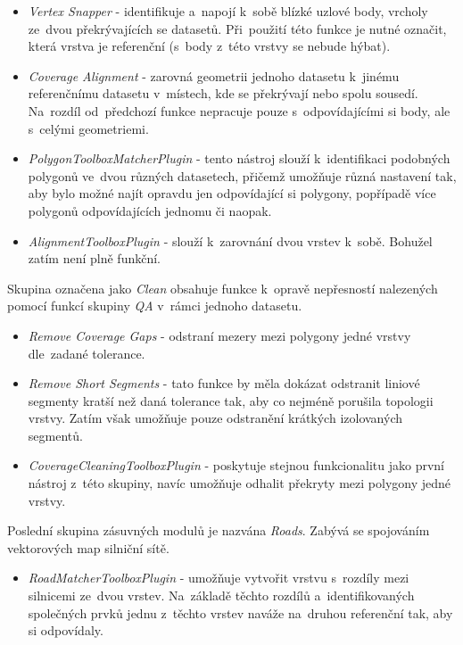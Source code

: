 \begin{itemize}
 \item \textit{Vertex Snapper} - identifikuje a~napojí k~sobě blízké uzlové
    body, vrcholy ze~dvou překrývajících se datasetů. Při~použití této funkce
    je nutné označit, která vrstva je referenční (s~body z~této vrstvy se 
    nebude hýbat).
 \item \textit{Coverage Alignment} - zarovná geometrii jednoho datasetu 
    k~jinému referenčnímu datasetu v~místech, kde se překrývají nebo spolu
    sousedí. Na~rozdíl od~předchozí funkce nepracuje pouze s~odpovídajícími
    si body, ale s~celými geometriemi.
 \item \textit{PolygonToolboxMatcherPlugin} - tento nástroj slouží k~identifikaci
    podobných polygonů ve~dvou různých datasetech, přičemž umožňuje různá 
    nastavení tak, aby bylo možné najít opravdu jen odpovídající si polygony,
    popřípadě více polygonů odpovídajících jednomu či naopak. 
 \item \textit{AlignmentToolboxPlugin} - slouží k~zarovnání dvou vrstev k~sobě.
    Bohužel zatím není plně funkční.
\end{itemize}

Skupina označena jako \textit{Clean} obsahuje funkce k~opravě nepřesností
nalezených pomocí funkcí skupiny \textit{QA} v~rámci jednoho datasetu.

\begin{itemize}
 \item \textit{Remove Coverage Gaps} - odstraní mezery mezi polygony jedné
    vrstvy dle~zadané tolerance.
 \item \textit{Remove Short Segments} - tato funkce by měla dokázat odstranit
    liniové segmenty kratší než daná tolerance tak, aby co nejméně porušila 
    topologii vrstvy. Zatím však umožňuje pouze odstranění krátkých izolovaných
    segmentů.
 \item \textit{CoverageCleaningToolboxPlugin} - poskytuje stejnou funkcionalitu
    jako první ná\-stroj z~této skupiny, navíc umožňuje odhalit překryty 
    mezi polygony jedné vrstvy.
\end{itemize}

Poslední skupina zásuvných modulů je nazvána \textit{Roads}. Zabývá se 
spojováním vektorových map silniční sítě.

\begin{itemize}
 \item \textit{RoadMatcherToolboxPlugin} - umožňuje vytvořit vrstvu s~rozdíly
    mezi silnicemi ze~dvou vrstev. Na~základě těchto rozdílů a~identifikovaných
    společných prvků jednu z~těchto vrstev naváže na~druhou referenční tak, 
    aby si odpovídaly.
\end{itemize}


